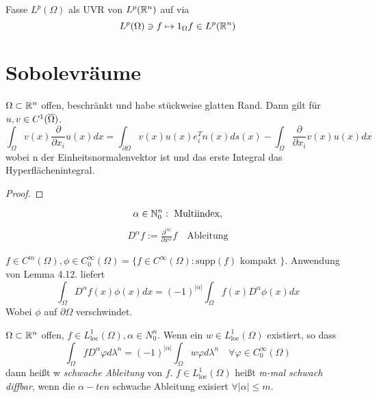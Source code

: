 	\begin{bem*}
		Fasse $L^p(\Omega)$ als UVR von $L^p(\mathbb{R}^n)$ auf via
			$$ L^p(\Omega) \ni f \mapsto 1_\Omega f \in L^p(\mathbb{R}^n)$$
	\end{bem*}

	\section{Sobolevräume}

		\begin{lemma}
			$\Omega \subset \mathbb{R}^n$ offen, beschränkt und habe stückweise glatten Rand. 
			Dann gilt für $u,v \in C^1(\overline{\Omega})$.
				$$\int_\Omega v(x) \frac{\partial}{\partial x_i} u(x) dx = 
				\int_{\partial \Omega} v(x)u(x) e_i^T n(x) ds(x) - \int_\Omega \frac{\partial}{\partial x_i} v(x) u(x) dx$$
				wobei n der Einheitsnormalenvektor ist und das erste Integral das Hyperflächenintegral.
		\end{lemma}
		\begin{proof}
			\todor[S.70]
		\end{proof}

	\begin{bem}[Notation]
		\vspace{-1em}
		$$\alpha \in \mathbb{N}_0^n: \text{ Multiindex},$$
		\begin{align*}
		D^\alpha f := \frac{\partial^{|\alpha|}}{\partial x^\alpha}f 
		\quad \text{Ableitung}
		\end{align*}
	\end{bem}

	\begin{bem}
		\vspace{-1em}
		$f\in C^m(\Omega), \phi\in C_0^\infty(\Omega) 
		= \{f\in C^\infty(\Omega): \text{supp}(f) \text{ kompakt }\}.$ 
		Anwendung von Lemma 4.12. liefert 
		 $$ \int_\Omega D^\alpha f(x) \phi(x) dx = (-1)^{|\alpha|}\int_\Omega f(x) D^\alpha \phi(x) dx$$ 
	Wobei $\phi$ auf $\partial \Omega$ verschwindet.
	\end{bem}

	\begin{definition}
		$\Omega \subset \mathbb{R}^n$ offen, $f\in L^1_{\text{loc}}(\Omega), \alpha \in N^n_0$. Wenn ein 
		$w \in L^1_{\text{loc}}(\Omega)$ existiert, so dass 
			$$\int_\Omega f D^\alpha \varphi d\lambda^n = (-1)^{|\alpha|} \int_\Omega w \varphi d\lambda^n 
			\quad \forall \varphi \in C_0^\infty(\Omega)$$
			dann heißt w \textit{schwache Ableitung} von $f$. $f \in L^1_{\text{loc}}(\Omega)$ heißt \textit{m-mal schwach diffbar}, wenn die $\alpha-ten$ schwache Ableitung exisiert $\forall |\alpha| \leq m$. 
	\end{definition}
	
